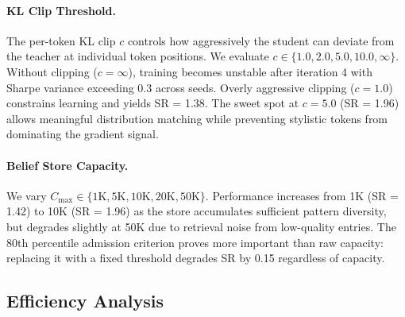 \paragraph{KL Clip Threshold.} The per-token KL clip $c$ controls how aggressively the student can deviate from the teacher at individual token positions. We evaluate $c \in \{1.0, 2.0, 5.0, 10.0, \infty\}$. Without clipping ($c{=}\infty$), training becomes unstable after iteration 4 with Sharpe variance exceeding 0.3 across seeds. Overly aggressive clipping ($c{=}1.0$) constrains learning and yields SR = 1.38. The sweet spot at $c{=}5.0$ (SR = 1.96) allows meaningful distribution matching while preventing stylistic tokens from dominating the gradient signal.

\paragraph{Belief Store Capacity.} We vary $C_{\max} \in \{1\text{K}, 5\text{K}, 10\text{K}, 20\text{K}, 50\text{K}\}$. Performance increases from 1K (SR = 1.42) to 10K (SR = 1.96) as the store accumulates sufficient pattern diversity, but degrades slightly at 50K due to retrieval noise from low-quality entries. The 80th percentile admission criterion proves more important than raw capacity: replacing it with a fixed threshold degrades SR by 0.15 regardless of capacity.

\subsection{Efficiency Analysis}



